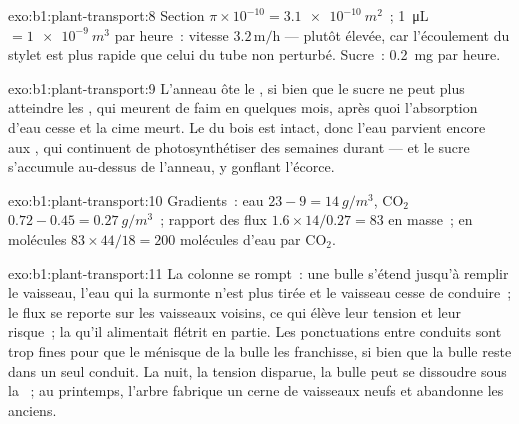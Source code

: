 \begin{solution}{exo:b1:plant-transport:8}
Section $\pi\times 10^{-10} = \qty{3.1e-10}{m^2}$~; \qty{1}{\micro L}
$= \qty{1e-9}{m^3}$ par heure~: vitesse $3.2\,\mathrm{m/h}$ --- plutôt
élevée, car l'écoulement du stylet est plus rapide que celui du tube
non perturbé. Sucre~: \qty{0.2}{mg} par heure.
\end{solution}

\begin{solution}{exo:b1:plant-transport:9}
L'anneau ôte le , si bien que le sucre ne peut plus atteindre
les , qui meurent de faim en quelques mois, après quoi
l'absorption d'eau cesse et la cime meurt. Le  du bois est
intact, donc l'eau parvient encore aux , qui continuent de
photosynthétiser des semaines durant --- et le sucre s'accumule
au-dessus de l'anneau, y gonflant l'écorce.
\end{solution}

\begin{solution}{exo:b1:plant-transport:10}
Gradients~: eau $23 - 9 = \qty{14}{g/m^3}$, $\mathrm{CO_2}$ $0.72 -
0.45 = \qty{0.27}{g/m^3}$~; rapport des flux $1.6\times 14/0.27 = 83$ en
masse~; en molécules $83\times 44/18 = 200$ molécules d'eau par
$\mathrm{CO_2}$.
\end{solution}

\begin{solution}{exo:b1:plant-transport:11}
La colonne se rompt~: une bulle s'étend jusqu'à remplir le vaisseau,
l'eau qui la surmonte n'est plus tirée et le vaisseau cesse de
conduire~; le flux se reporte sur les vaisseaux voisins, ce qui élève
leur tension et leur risque~; la  qu'il alimentait flétrit en
partie. Les ponctuations entre conduits sont trop fines pour que le
ménisque de la bulle les franchisse, si bien que la bulle reste dans un
seul conduit. La nuit, la tension disparue, la bulle peut se dissoudre
sous la ~; au printemps, l'arbre fabrique un cerne de
vaisseaux neufs et abandonne les anciens.
\end{solution}

